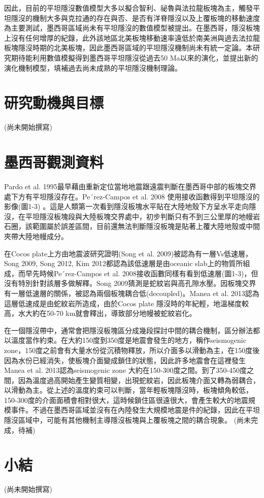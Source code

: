 因此，目前的平坦隱沒數值模型大多以擬合智利、祕魯與法拉龍板塊為主，觸發平坦隱沒的機制大多與克拉通的存在與否、是否有洋脊隱沒以及上覆板塊的移動速度為主要測試，墨西哥區域尚未有平坦隱沒的數值模型被提出。在墨西哥，隱沒板塊上沒有任何增厚的紀錄，此外該地區北美板塊移動速率遠低於南美洲與過去法拉龍板塊隱沒時期的北美板塊，因此墨西哥區域的平坦隱沒機制尚未有統一定論。本研究期待能利用數值模擬得到墨西哥平坦隱沒從過去50 Ma以來的演化，並提出新的演化機制模型，填補過去尚未成熟的平坦隱沒機制理論。

\section{研究動機與目標}

(尚未開始撰寫)

\section{墨西哥觀測資料}

Pardo et al. 1995最早藉由重新定位當地地震跟遠震判斷在墨西哥中部的板塊交界處下方有平坦隱沒存在。Pe´rez-Campos et al. 2008 使用接收函數得到平坦隱沒的影像(圖1-3) 。這是人類第一次看到隱沒板塊水平貼在大陸地殼下方呈水平走向隱沒，在平坦隱沒板塊段與大陸板塊交界處中，初步判斷只有不到三公里厚的地幔岩石圈，該範圍屬於誤差區間，目前還無法判斷隱沒板塊是貼著上覆大陸地殼或中間夾帶大陸地幔成分。

在Cocos plate上方由地震波研究證明(Song et al. 2009)被認為有一層Vs低速層，Song 2009, Song 2012, Kim 2012都認為該低速層是由oceanic slab上的物質所組成，而早先時候Pe´rez-Campos et al. 2008接收函數同樣有看到低速層(圖1-3)，但沒有特別針對該層多做解釋。Song 2009猜測是蛇紋岩與高孔隙水壓。因板塊交界有一層低速層的關係，被認為兩個板塊耦合低(decoupled)。Manea et al. 2013認為這層低速成是由蛇紋岩所造成，由於Cocos plate 隱沒時的年紀輕，地溫梯度較高，水大約在50-70 km就會釋出，導致部分地幔被蛇紋岩化。

在一個隱沒帶中，通常會把隱沒板塊區分成幾段探討中間的耦合機制，區分辦法都以溫度當作約束。在大約150度到350度是地震會發生的地方，稱作seismogenic zone，150度之前會有大量水份從沉積物釋放，所以介面多以滑動為主，在150度後因為水份已經消失，使板塊介面變成鎖住的狀態，因此許多地震會在這裡發生 Manea et al. 2013認為seismogenic zone 大約在150-300度之間。到了350-450度之間，因為溫度過高開始產生變質相變，出現蛇紋岩，因此板塊介面又轉為弱耦合，以滑動為主。從上述的溫度約束可以判斷，當年輕板塊隱沒時，板塊傾角較低，150-300度的介面面積會相對很大，這時候鎖住區很遠很大，會產生較大的地震規模事件。不過在墨西哥區域並沒有在內陸發生大規模地震是件的紀錄，因此在平坦隱沒區域中，可能有其他機制主導隱沒板塊與上覆板塊之間的耦合現象。
(尚未完成，待補)


\section{小結}

(尚未開始撰寫)
